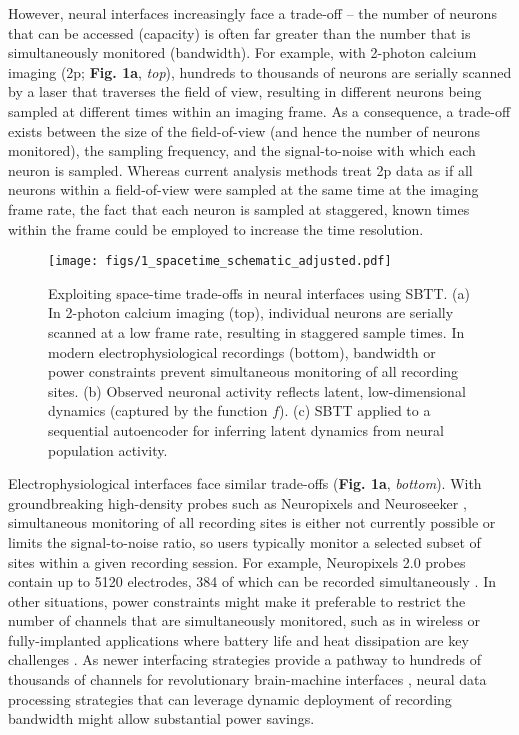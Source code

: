 \documentclass{article}
\begin{document}
However, neural interfaces increasingly face a trade-off -- the number of neurons that can be accessed (capacity) is often far greater than the number that is simultaneously monitored (bandwidth). For example, with 2-photon calcium imaging (2p; \textbf{Fig. 1a}, \textit{top}), hundreds to thousands of neurons are serially scanned by a laser that traverses the field of view, resulting in different neurons being sampled at different times within an imaging frame. As a consequence, a trade-off exists between the size of the field-of-view (and hence the number of neurons monitored), the sampling frequency, and the signal-to-noise with which each neuron is sampled. Whereas current analysis methods treat 2p data as if all neurons within a field-of-view were sampled at the same time at the imaging frame rate, the fact that each neuron is sampled at staggered, known times within the frame could be employed to increase the time resolution.

\begin{figure}[!b]
  \centering
  \texttt{[image: figs/1\_spacetime\_schematic\_adjusted.pdf]}
  \caption{Exploiting space-time trade-offs in neural interfaces using SBTT. (a) In 2-photon calcium imaging (top), individual neurons are serially scanned at a low frame rate, resulting in staggered sample times. In modern electrophysiological recordings (bottom), bandwidth or power constraints prevent simultaneous monitoring of all recording sites. (b) Observed neuronal activity reflects latent, low-dimensional dynamics (captured by the function $f$). (c) SBTT applied to a sequential autoencoder for inferring latent dynamics from neural population activity.}
  \label{fig:spacetime_schematic}
\end{figure}

Electrophysiological interfaces face similar trade-offs (\textbf{Fig. 1a}, \textit{bottom}). With groundbreaking high-density probes such as Neuropixels and Neuroseeker \cite{jun2017fully,steinmetz2021neuropixels,raducanu2017time}, simultaneous monitoring of all recording sites is either not currently possible or limits the signal-to-noise ratio, so users typically monitor a selected subset of sites within a given recording session. For example, Neuropixels 2.0 probes contain up to 5120 electrodes, 384 of which can be recorded simultaneously \cite{steinmetz2021neuropixels}. In other situations, power constraints might make it preferable to restrict the number of channels that are simultaneously monitored, such as in wireless or fully-implanted applications where battery life and heat dissipation are key challenges \cite{miranda2010hermesd,borton2013implantable,simeral2021home}. As newer interfacing strategies provide a pathway to hundreds of thousands of channels for revolutionary brain-machine interfaces \cite{sahasrabuddhe2021argo,musk2019integrated}, neural data processing strategies that can leverage dynamic deployment of recording bandwidth might allow substantial power savings.
\end{document}
